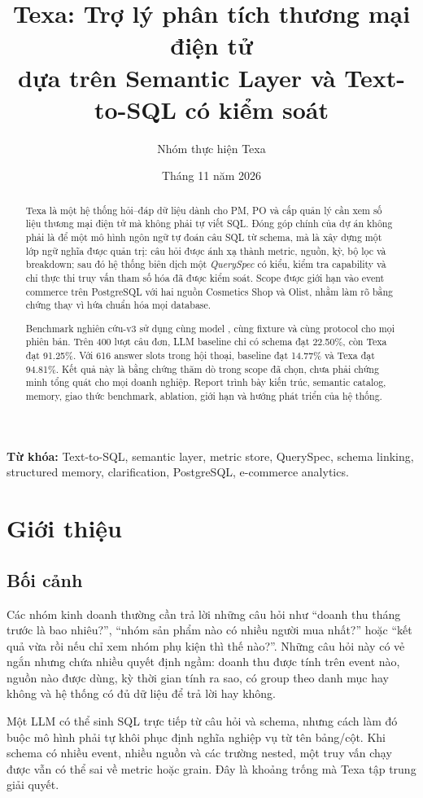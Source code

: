 \documentclass[11pt,a4paper]{article}
\title{\textbf{Texa: Trợ lý phân tích thương mại điện tử\\ dựa trên Semantic Layer và Text-to-SQL có kiểm soát}}
\author{Nhóm thực hiện Texa}\date{Tháng 11 năm 2026}
\newcommand{\texa}{\textsf{Texa}}\newcommand{\code}[1]{\texttt{\detokenize{#1}}}
\begin{document}
\maketitle
\begin{abstract}
\texa{} là một hệ thống hỏi--đáp dữ liệu dành cho PM, PO và cấp quản lý cần xem số liệu thương mại điện tử mà không phải tự viết SQL. Đóng góp chính của dự án không phải là để một mô hình ngôn ngữ tự đoán câu SQL từ schema, mà là xây dựng một lớp ngữ nghĩa được quản trị: câu hỏi được ánh xạ thành metric, nguồn, kỳ, bộ lọc và breakdown; sau đó hệ thống biên dịch một \emph{QuerySpec} có kiểu, kiểm tra capability và chỉ thực thi truy vấn tham số hóa đã được kiểm soát. Scope được giới hạn vào event commerce trên PostgreSQL với hai nguồn Cosmetics Shop và Olist, nhằm làm rõ bằng chứng thay vì hứa chuẩn hóa mọi database.

Benchmark nghiên cứu-v3 sử dụng cùng model \code{gpt-6-luna}, cùng fixture và cùng protocol cho mọi phiên bản. Trên 400 lượt câu đơn, LLM baseline chỉ có schema đạt 22.50\%, còn Texa đạt 91.25\%. Với 616 answer slots trong hội thoại, baseline đạt 14.77\% và Texa đạt 94.81\%. Kết quả này là bằng chứng thăm dò trong scope đã chọn, chưa phải chứng minh tổng quát cho mọi doanh nghiệp. Report trình bày kiến trúc, semantic catalog, memory, giao thức benchmark, ablation, giới hạn và hướng phát triển của hệ thống.
\end{abstract}
\textbf{Từ khóa:} Text-to-SQL, semantic layer, metric store, QuerySpec, schema linking, structured memory, clarification, PostgreSQL, e-commerce analytics.
\tableofcontents\newpage

\section{Giới thiệu}
\subsection{Bối cảnh}
Các nhóm kinh doanh thường cần trả lời những câu hỏi như ``doanh thu tháng trước là bao nhiêu?'', ``nhóm sản phẩm nào có nhiều người mua nhất?'' hoặc ``kết quả vừa rồi nếu chỉ xem nhóm phụ kiện thì thế nào?''. Những câu hỏi này có vẻ ngắn nhưng chứa nhiều quyết định ngầm: doanh thu được tính trên event nào, nguồn nào được dùng, kỳ thời gian tính ra sao, có group theo danh mục hay không và hệ thống có đủ dữ liệu để trả lời hay không.

Một LLM có thể sinh SQL trực tiếp từ câu hỏi và schema, nhưng cách làm đó buộc mô hình phải tự khôi phục định nghĩa nghiệp vụ từ tên bảng/cột. Khi schema có nhiều event, nhiều nguồn và các trường nested, một truy vấn chạy được vẫn có thể sai về metric hoặc grain. Đây là khoảng trống mà Texa tập trung giải quyết.
\end{document}
